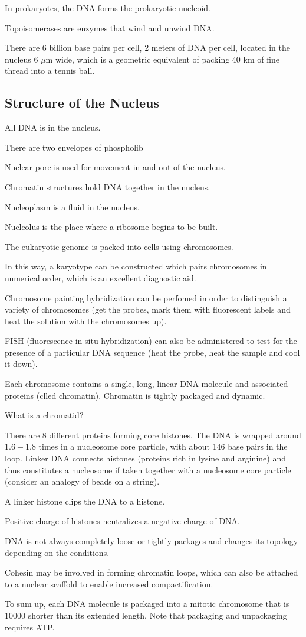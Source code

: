 \documentclass[11pt]{scrartcl}
\begin{document}
In prokaryotes, the DNA forms the prokaryotic nucleoid.

Topoisomerases are enzymes that wind and unwind DNA.

There are 6 billion base pairs per cell, 2 meters of DNA per cell,
located in the nucleus 6 $\mu$m wide, which is a geometric equivalent
of packing 40 km of fine thread into a tennis ball.
\subsection{Structure of the Nucleus}
All DNA is in the nucleus.

There are two envelopes of phospholib

Nuclear pore is used for movement in and out of the nucleus.

Chromatin structures hold DNA together in the nucleus.

Nucleoplasm is a fluid in the nucleus.

Nucleolus is the place where a ribosome begins to be built.

The eukaryotic genome is packed into cells using chromosomes.

In this way, a karyotype can be constructed which pairs chromosomes in
numerical order, which is an excellent diagnostic aid.

Chromosome painting hybridization can be perfomed in order to
distinguish a variety of chromosomes (get the probes, mark them with
fluorescent labels and heat the solution with the chromosomes up).

FISH (fluorescence in situ hybridization) can also be administered to
test for the presence of a particular DNA sequence (heat the probe,
heat the sample and cool it down).

Each chromosome contains a single, long, linear DNA molecule and
associated proteins (clled chromatin). Chromatin is tightly packaged
and dynamic.

\begin{ques*}

What is a chromatid?

\end{ques*}

There are 8 different proteins forming core histones. The DNA is
wrapped around $1.6-1.8$ times in a nucleosome core particle, with
about 146 base pairs in the loop. Linker DNA connects histones
(proteins rich in lysine and arginine) and thus constitutes a
nucleosome if taken together with a nucleosome core particle (consider
an analogy of beads on a string).

A linker histone clips the DNA to a histone.

Positive charge of histones neutralizes a negative charge of DNA.

DNA is not always completely loose or tightly packages and changes its
topology depending on the conditions.

Cohesin may be involved in forming chromatin loops, which can also be
attached to a nuclear scaffold to enable increased compactification.

To sum up, each DNA molecule is packaged into a mitotic chromosome
that is $10000$ shorter than its extended length. Note that packaging
and unpackaging requires ATP.
\end{document}
